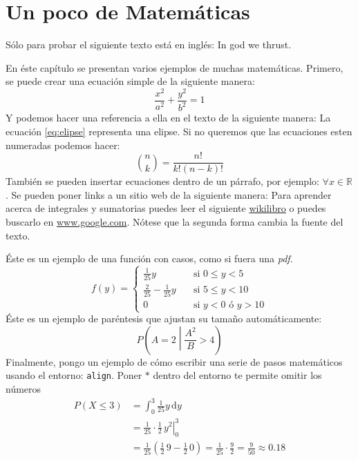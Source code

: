 \section{Un poco de Matemáticas}
\label{sec:mate}

Sólo para probar el siguiente texto está en inglés: \textenglish{In god we thrust}.

En éste capítulo se presentan varios ejemplos de muchas matemáticas.
Primero, se puede crear una ecuación simple de la siguiente manera:
\begin{equation}
 \label{eq:elipse}
 \frac{x^{2}}{a^{2}} + \frac{y^{2}}{b^{2}} = 1
\end{equation}
Y podemos hacer una referencia a ella en el texto de la siguiente manera: La  ecuación \eqref{eq:elipse} representa una elipse.
Si no queremos que las ecuaciones esten numeradas podemos hacer:
\begin{equation}
 \nonumber
 \binom{n}{k} = \frac{n!}{k!(n-k)!}
\end{equation}
También se pueden insertar ecuaciones dentro de un párrafo, por ejemplo: $\forall x \in \mathbb{R}$.
Se pueden poner links a un sitio web de la siguiente manera:
Para aprender acerca de integrales y sumatorias puedes leer el siguiente \href{https://en.wikibooks.org/wiki/LaTeX/Mathematics#Sums_and_integrals}{wikilibro} o puedes buscarlo en \url{www.google.com}.
Nótese que la segunda forma cambia la fuente del texto.

Éste es un ejemplo de una función con casos, como si fuera una \emph{pdf}.
\begin{equation}
 \label{eq:pdf}
 f(y) =
 \begin{cases}
   \frac{1}{25} y & \quad \text{si } 0 \leq y < 5 \\
   \frac{2}{25} - \frac{1}{25} y & \quad \text{si } 5 \leq y < 10 \\
   0 & \quad \text{si } y < 0 \text{ ó } y > 10
 \end{cases}
\end{equation}
Éste es un ejemplo de paréntesis que ajustan su tamaño automáticamente:
\begin{equation}
 \nonumber
 P\left(A=2\middle|\frac{A^2}{B}>4\right)
\end{equation}
Finalmente, pongo un ejemplo de cómo escribir una serie de pasos matemáticos usando el entorno: \verb|align|.
Poner $*$ dentro del entorno te permite omitir los números
\begin{align*}
P\left(X \leq 3 \right) &= \int_{0}^{3} \frac{1}{25} y \,\mathrm{d}y \\
     &= \left. \frac{1}{25} \cdot \frac{1}{2} \, y^{2} \right|_0^3 \\
     &= \frac{1}{25} \left( \frac{1}{2} \, 9 - \frac{1}{2} \, 0 \right) =
     \frac{1}{25} \cdot \frac{9}{2} = \frac{9}{50} \approx 0.18
\end{align*}


